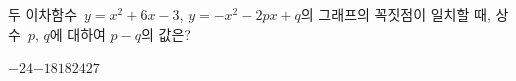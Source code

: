 두 이차함수~$y=x^2+6x-3$, $y=-x^2-2px+q$의 그래프의 꼭짓점이 일치할 때, 상수~$p$, $q$에 대하여 $p-q$의 값은?
\begin{choices32}{$-24$}{$-18$}{$18$}{$24$}{$27$}\end{choices32}
